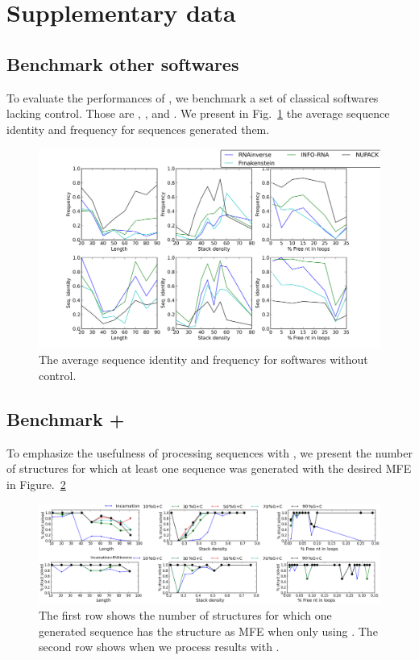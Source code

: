 \section{Supplementary data}

\subsection{Benchmark other softwares}
To evaluate the performances of \ourprog, we benchmark a set of classical softwares lacking \GCContent control. Those are \RNAinverse, \INFORNA, \NUPACK and \frankenstein. We present in Fig.~\ref{fig:no_gc_control} the average sequence identity and frequency
for sequences generated them.

\begin{figure}[ht!]
  \centering
  \includegraphics[width=\textwidth]{Figures/entropy_nogc}
  \caption{The average sequence identity and frequency for softwares without \GCContent control.}
  \label{fig:no_gc_control}
\end{figure}

\subsection{Benchmark \ourprog+\RNAinverse}
To emphasize the usefulness of processing \ourprog sequences with \RNAinverse, we present the number
of structures for which at least one sequence was generated with the desired MFE in Figure.~\ref{fig:nb_sols}

\begin{figure}[ht!]
  \centering
  \includegraphics[width=\textwidth]{Figures/struct_solved_vsrnainverse.png}
  \caption{The first row shows the number of structures for which one generated sequence has the 
  structure as MFE when only using \ourprog. The second row shows when we process \ourprog results with \RNAinverse.}
  \label{fig:nb_sols}
\end{figure}


